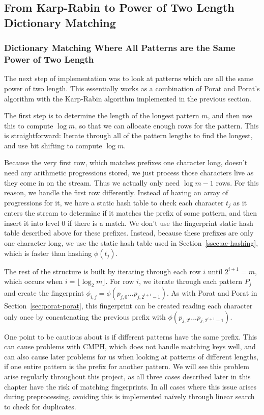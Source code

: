 \documentclass[ %
                    author={Dominic Joseph Moylett},
                    degree={MEng},
                     title={Dictionary Matching with Fingerprints},
                  subtitle={An Empirical Analysis},
                      type={research},
                      year={2015} ]{dissertation}
\begin{document}
\subsection{From Karp-Rabin to Power of Two Length Dictionary Matching}

\subsubsection{Dictionary Matching Where All Patterns are the Same Power of Two Length}

The next step of implementation was to look at patterns which are all the same power of two length. This essentially works as a combination of Porat and Porat's algorithm with the Karp-Rabin algorithm implemented in the previous section.

The first step is to determine the length of the longest pattern $m$, and then use this to compute $\log m$, so that we can allocate enough rows for the pattern. This is straightforward: Iterate through all of the pattern lengths to find the longest, and use bit shifting to compute $\log m$.

Because the very first row, which matches prefixes one character long, doesn't need any arithmetic progressions stored, we just process those characters live as they come in on the stream. Thus we actually only need $\log m - 1$ rows. For this reason, we handle the first row differently. Instead of having an array of progressions for it, we have a static hash table to check each character $t_j$ as it enters the stream to determine if it matches the prefix of some pattern, and then insert it into level 0 if there is a match. We don't use the fingerprint static hash table described above for these prefixes. Instead, because these prefixes are only one character long, we use the static hash table used in Section~\ref{ssec:ac-hashing}, which is faster than hashing $\phi(t_j)$.

The rest of the structure is built by iterating through each row $i$ until $2^{i+1} = m$, which occurs when $i = \lfloor\log_2m\rfloor$. For row $i$, we iterate through each pattern $P_j$ and create the fingerprint $\phi_{i,j} = \phi(p_{j,0}...p_{j,2^{i + 1} - 1})$. As with Porat and Porat in Section~\ref{sec:porat-porat}, this fingerprint can be created reading each character only once by concatenating the previous prefix with $\phi(p_{j,2^{i}}...p_{j,2^{i + 1} - 1})$.

One point to be cautious about is if different patterns have the same prefix. This can cause problems with CMPH, which does not handle matching keys well, and can also cause later problems for us when looking at patterns of different lengths, if one entire pattern is the prefix for another pattern. We will see this problem arise regularly throughout this project, as all three cases described later in this chapter have the risk of matching fingerprints. In all cases where this issue arises during preprocessing, avoiding this is implemented na\"{i}vely through linear search to check for duplicates.
\end{document}
